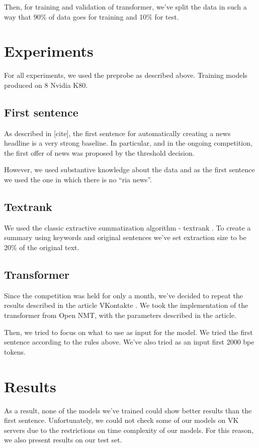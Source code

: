 \documentclass{dialogue}
\begin{document}
Then, for training and validation of transformer, we've split the data in such a way that 90\% of data goes for training and 10\% for test.

\section{Experiments}
For all experiments, we used the preprobe as described above. Training models produced on 8 Nvidia K80.

\subsection{First sentence}

As described in [cite], the first sentence for automatically creating a news headline is a very strong baseline. In particular, and in the ongoing competition, the first offer of news was proposed by the threshold decision.

However, we used substantive knowledge about the data and as the first sentence we used the one in which there is no “ria news”.

\subsection{Textrank}

We used the classic extractive summatization algorithm - textrank \cite{}. To create a summary using keywords and original sentences we've set extraction size to be 20\% of the original text.

\subsection{Transformer}

Since the competition was held for only a month, we've decided to repeat the results described in the article VKontakte \cite{}. We took the implementation of the transformer from Open NMT, with the parameters described in the article.

Then, we tried to focus on what to use as input for the model. We tried the first sentence according to the rules above. We've also tried as an input first 2000 bpe tokens.

\section{Results}

As a result, none of the models we've trained could show better results than the first sentence. Unfortunately, we could not check some of our models on VK servers due to the restrictions on time complexity of our models. For this reason, we also present results on our test set.
\end{document}
